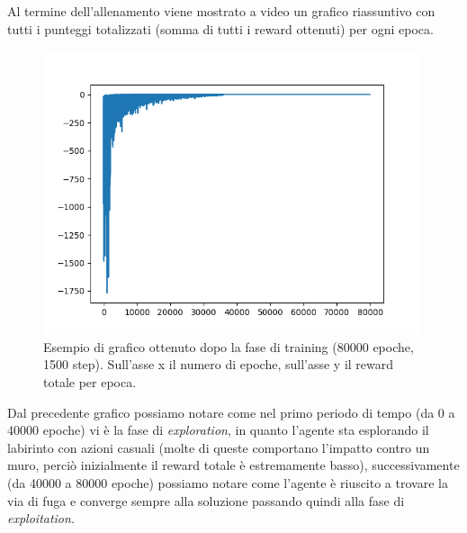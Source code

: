 Al termine dell'allenamento viene mostrato a video un grafico riassuntivo con tutti i punteggi totalizzati (somma di tutti i reward ottenuti) per ogni epoca.\\

\begin{figure}[H]
	\centering
	\includegraphics[width=30em]{img/esempio_plot.png}
	\caption{Esempio di grafico ottenuto dopo la fase di training (80000 epoche, 1500 step). Sull'asse x il numero di epoche, sull'asse y il reward totale per epoca.}
\end{figure}

Dal precedente grafico possiamo notare come nel primo periodo di tempo (da 0 a 40000 epoche) vi \`{e} la fase di \textit{exploration}, in quanto l'agente sta esplorando il labirinto con azioni casuali (molte di queste comportano l'impatto contro un muro, perci\`{o} inizialmente il reward totale \`{e} estremamente basso), successivamente (da 40000 a 80000 epoche) possiamo notare come l'agente \`{e} riuscito a trovare la via di fuga e converge sempre alla soluzione passando quindi alla fase di \textit{exploitation}.\\

